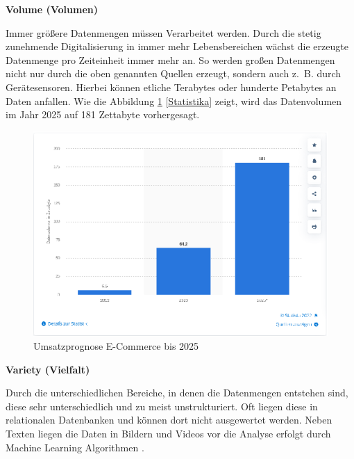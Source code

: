 \textbf{Volume (Volumen)}\vspace{0.2cm}

Immer größere Datenmengen müssen Verarbeitet werden. Durch die stetig zunehmende Digitalisierung in immer mehr Lebensbereichen wächst die erzeugte Datenmenge pro Zeiteinheit immer mehr an. So werden großen Datenmengen nicht nur durch die oben genannten Quellen erzeugt, sondern auch z. B. durch Gerätesensoren. Hierbei können etliche Terabytes oder hunderte Petabytes an Daten anfallen. Wie die Abbildung \ref{img:stat_prognose_2022} [\href{https://de.statista.com/statistik/daten/studie/267974/umfrage/prognose-zum-weltweit-generierten-datenvolumen}{Statistika}] zeigt, wird das Datenvolumen im Jahr 2025 auf 181 Zettabyte vorhergesagt.\vspace{0.2cm}

\begin{figure}[!ht]
	\centering
	\includegraphics[width=\linewidth]{images/chapter2/umsatzprognose_2025.eps}
	\caption{Umsatzprognose E-Commerce bis 2025 \cite{ecommerce_statistics:versteegen2022}}
	\label{img:stat_prognose_2022}
\end{figure}


\textbf{Variety (Vielfalt)}\vspace{0.2cm}

Durch die unterschiedlichen Bereiche, in denen die Datenmengen entstehen sind, diese sehr unterschiedlich und zu meist unstrukturiert. Oft liegen diese in relationalen Datenbanken und können dort nicht ausgewertet werden. Neben Texten liegen die Daten in Bildern und Videos vor die Analyse erfolgt durch Machine Learning Algorithmen .\vspace{0.5cm}

